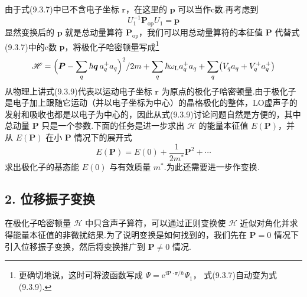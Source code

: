 由于式(9.3.7)中已不含电子坐标 $\boldsymbol{r}$，在这里的 $\boldsymbol{p}$ 可以当作c数.再考虑到
\begin{equation}
  U_{1}^{-1}\boldsymbol{P}_{\mathrm{op}}U_{1}=\boldsymbol{p}
\end{equation}
显然变换后的 $\boldsymbol{p}$ 就是总动量算符 $\boldsymbol{P}_{\mathrm{op}}$，我们可以用总动量算符的本征值 $\boldsymbol{P}$ 代替式(9.3.7)中的c数 $\boldsymbol{p}$，将极化子哈密顿量写成\footnote{更确切地说，这时可将波函数写成
$\varPsi=\mathrm{e}^{\mathrm{i}\boldsymbol{P}\cdot\boldsymbol{r}/\hbar}\varPsi_{1}$，
式(9.3.7)自动变为式(9.3.9).}
\begin{equation}
  \mathscr{H}=\Bigl(\boldsymbol{P}-\sum_{q}\hbar\boldsymbol{q}\,a_{q}^{+}a_{q}\Bigr)^{2}/2m
  +\sum_{q}\hbar\omega_{\mathrm L}a_{q}^{+}a_{q}
  +\sum_{q}\bigl(V_{q}a_{q}+V_{q}^{+}a_{q}^{+}\bigr)
\end{equation}
从物理上讲式(9.3.9)代表以运动电子坐标 $\boldsymbol{r}$ 为原点的极化子哈密顿量.由于极化子是电子加上跟随它运动（并以电子坐标为中心）的晶格极化的整体，LO虚声子的发射和吸收也都是以电子为中心的，因此从式(9.3.9)讨论问题自然是方便的，其中总动量 $\boldsymbol{P}$ 只是一个参数.下面的任务是进一步求出 $\mathscr{H}$ 的能量本征值 $E(\boldsymbol{P})$，并从 $E(\boldsymbol{P})$ 在小 $\boldsymbol{P}$ 情况下的展开式
\begin{equation}
  E(\boldsymbol{P})=E(0)+\frac{1}{2m^{*}}\boldsymbol{P}^{2}+\cdots
\end{equation}
求出极化子的基态能 $E(0)$ 与有效质量 $m^{*}$.为此还需要进一步作变换.

\subsection*{2. 位移振子变换}

在极化子哈密顿量 $\mathscr{H}$ 中只含声子算符，可以通过正则变换使 $\mathscr{H}$ 近似对角化并求得能量本征值的非微扰结果.为了说明变换是如何找到的，我们先在 $\boldsymbol{P}=0$ 情况下引入位移振子变换，然后将变换推广到 $\boldsymbol{P}\neq0$ 情况.

